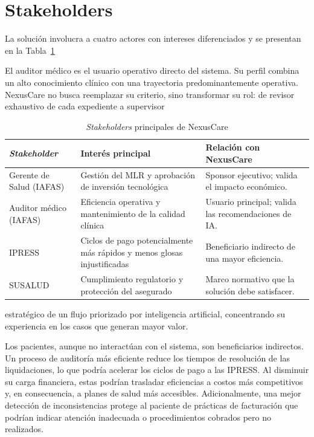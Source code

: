 \section{Stakeholders}

La solución involucra a cuatro actores con intereses diferenciados y se presentan en la
Tabla~\ref{tab:stakeholders-nexuscare}

El auditor médico es el usuario operativo directo del sistema. Su perfil combina un alto conocimiento clínico con una trayectoria predominantemente operativa. NexusCare no busca reemplazar su criterio, sino transformar su rol: de revisor exhaustivo de cada expediente a supervisor

\begin{table}[H]
    \centering
    \caption{\textit{Stakeholders} principales de NexusCare}
    \label{tab:stakeholders-nexuscare}

    \begin{tabular}{
        p{}
        p{}
        p{}
    }
        \toprule
        \textbf{\textit{Stakeholder}}
        & \textbf{Interés principal}
        & \textbf{Relación con NexusCare} \\
        \midrule

        Gerente de Salud (IAFAS)
        & Gestión del MLR y aprobación de inversión tecnológica
        & Sponsor ejecutivo; valida el impacto económico. \\

        Auditor médico (IAFAS)
        & Eficiencia operativa y mantenimiento de la calidad clínica
        & Usuario principal; valida las recomendaciones de IA. \\

        IPRESS
        & Ciclos de pago potencialmente más rápidos y menos glosas injustificadas
        & Beneficiario indirecto de una mayor eficiencia. \\

        SUSALUD
        & Cumplimiento regulatorio y protección del asegurado
        & Marco normativo que la solución debe satisfacer. \\

        \bottomrule
    \end{tabular}
\end{table}

estratégico de un flujo priorizado por inteligencia artificial, concentrando su experiencia en los casos que generan mayor valor.

Los pacientes, aunque no interactúan con el sistema, son beneficiarios indirectos. Un proceso de auditoría más eficiente reduce los tiempos de resolución de las liquidaciones, lo que podría acelerar los ciclos de pago a las IPRESS. Al disminuir su carga financiera, estas podrían trasladar eficiencias a costos más competitivos y, en consecuencia, a planes de salud más accesibles. Adicionalmente, una mejor detección de inconsistencias protege al paciente de prácticas de facturación que podrían indicar atención inadecuada o procedimientos cobrados pero no realizados.

